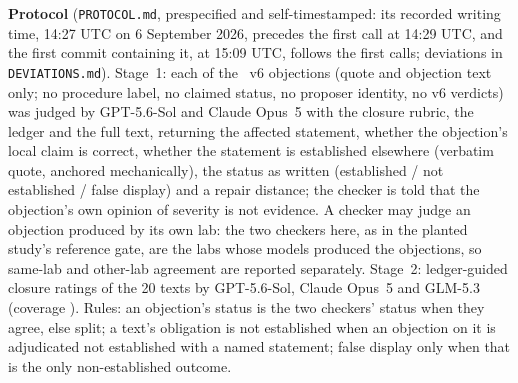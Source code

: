 \textbf{Protocol} (\texttt{PROTOCOL.md}, prespecified and self-timestamped: its recorded writing time, 14:27 UTC on 6 September 2026, precedes the first call at 14:29 UTC, and the first commit containing it, at 15:09 UTC, follows the first calls; deviations in \texttt{DEVIATIONS.md}). Stage~1: each of the \REFADJN\ v6 objections (quote and objection text only; no procedure label, no claimed status, no proposer identity, no v6 verdicts) was judged by GPT-5.6-Sol and Claude Opus~5 with the closure rubric, the ledger and the full text, returning the affected statement, whether the objection's local claim is correct, whether the statement is established elsewhere (verbatim quote, anchored mechanically), the status as written (established / not established / false display) and a repair distance; the checker is told that the objection's own opinion of severity is not evidence. A checker may judge an objection produced by its own lab: the two checkers here, as in the planted study's reference gate, are the labs whose models produced the objections, so same-lab and other-lab agreement are reported separately. Stage~2: ledger-guided closure ratings of the 20 texts by GPT-5.6-Sol, Claude Opus~5 and GLM-5.3 (coverage \REFADJRATINGS). Rules: an objection's status is the two checkers' status when they agree, else split; a text's obligation is not established when an objection on it is adjudicated not established with a named statement; false display only when that is the only non-established outcome.

